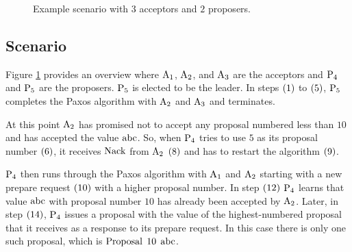 \begin{figure}
\begin{center}
\end{center}
\caption{Example scenario with $3$ acceptors and $2$ proposers.}
\label{fig:scenario}
\end{figure}

\subsection{Scenario}
Figure \ref{fig:scenario} provides an overview where $\operatorname{A_{1}}$, $\operatorname{A_{2}}$, and $\operatorname{A_{3}}$ are the acceptors and $\operatorname{P_{4}}$ and $\operatorname{P_{5}}$ are the proposers.
$\operatorname{P_{5}}$ is elected to be the leader.
In steps $\left(1\right)$ to $\left(5\right)$, $\operatorname{P_{5}}$ completes the Paxos algorithm with $\operatorname{A_{2}}$ and $\operatorname{A_{3}}$ and terminates.

At this point $\operatorname{A_{2}}$ has promised not to accept any proposal numbered less than $10$ and has accepted the value $\operatorname{abc}$.
So, when $\operatorname{P_{4}}$ tries to use $5$ as its proposal number $\left(6\right)$, it receives $\operatorname{Nack}$ from $\operatorname{A_{2}}$ $\left(8\right)$ and has to restart the algorithm $\left(9\right)$.

$\operatorname{P_{4}}$ then runs through the Paxos algorithm with $\operatorname{A_{1}}$ and $\operatorname{A_{2}}$ starting with a new prepare request $\left(10\right)$ with a higher proposal number.
In step $\left(12\right)$ $\operatorname{P_{4}}$ learns that value $\operatorname{abc}$ with proposal number $10$ has already been accepted by $\operatorname{A_{2}}$.
Later, in step $\left(14\right)$, $\operatorname{P_{4}}$ issues a proposal with the value of the highest-numbered proposal that it receives as a response to its prepare request.
In this case there is only one such proposal, which is $\operatorname{Proposal}\; 10\; \operatorname{abc}$.

